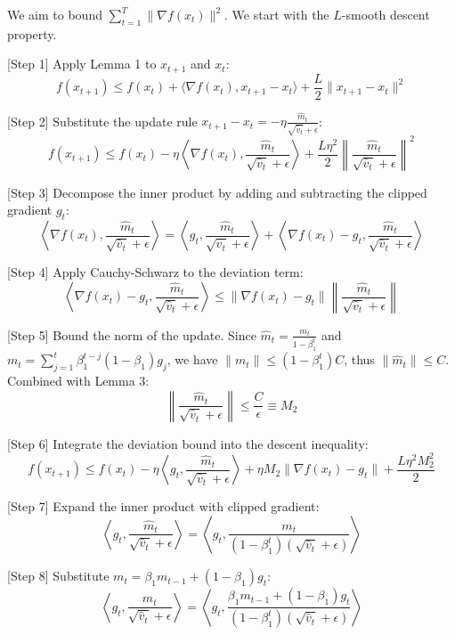 \documentclass{article}
\begin{document}
We aim to bound $\sum_{t=1}^T \|\nabla f(x_t)\|^2$. We start with the $L$-smooth descent property.

[Step 1] Apply Lemma 1 to $x_{t+1}$ and $x_t$:
$$ f(x_{t+1}) \leq f(x_t) + \langle \nabla f(x_t), x_{t+1} - x_t \rangle + \frac{L}{2} \|x_{t+1} - x_t\|^2 $$

[Step 2] Substitute the update rule $x_{t+1} - x_t = -\eta \frac{\hat{m}_t}{\sqrt{\hat{v}_t} + \epsilon}$:
$$ f(x_{t+1}) \leq f(x_t) - \eta \left\langle \nabla f(x_t), \frac{\hat{m}_t}{\sqrt{\hat{v}_t} + \epsilon} \right\rangle + \frac{L \eta^2}{2} \left\| \frac{\hat{m}_t}{\sqrt{\hat{v}_t} + \epsilon} \right\|^2 $$

[Step 3] Decompose the inner product by adding and subtracting the clipped gradient $g_t$:
$$ \left\langle \nabla f(x_t), \frac{\hat{m}_t}{\sqrt{\hat{v}_t} + \epsilon} \right\rangle = \left\langle g_t, \frac{\hat{m}_t}{\sqrt{\hat{v}_t} + \epsilon} \right\rangle + \left\langle \nabla f(x_t) - g_t, \frac{\hat{m}_t}{\sqrt{\hat{v}_t} + \epsilon} \right\rangle $$

[Step 4] Apply Cauchy-Schwarz to the deviation term:
$$ \left\langle \nabla f(x_t) - g_t, \frac{\hat{m}_t}{\sqrt{\hat{v}_t} + \epsilon} \right\rangle \leq \|\nabla f(x_t) - g_t\| \left\| \frac{\hat{m}_t}{\sqrt{\hat{v}_t} + \epsilon} \right\| $$

[Step 5] Bound the norm of the update. Since $\hat{m}_t = \frac{m_t}{1-\beta_1^t}$ and $m_t = \sum_{j=1}^t \beta_1^{t-j} (1-\beta_1) g_j$, we have $\|m_t\| \leq (1-\beta_1^t) C$, thus $\|\hat{m}_t\| \leq C$. Combined with Lemma 3:
$$ \left\| \frac{\hat{m}_t}{\sqrt{\hat{v}_t} + \epsilon} \right\| \leq \frac{C}{\epsilon} \equiv M_2 $$

[Step 6] Integrate the deviation bound into the descent inequality:
$$ f(x_{t+1}) \leq f(x_t) - \eta \left\langle g_t, \frac{\hat{m}_t}{\sqrt{\hat{v}_t} + \epsilon} \right\rangle + \eta M_2 \|\nabla f(x_t) - g_t\| + \frac{L \eta^2 M_2^2}{2} $$

[Step 7] Expand the inner product with clipped gradient:
$$ \left\langle g_t, \frac{\hat{m}_t}{\sqrt{\hat{v}_t} + \epsilon} \right\rangle = \left\langle g_t, \frac{m_t}{(1-\beta_1^t)(\sqrt{\hat{v}_t} + \epsilon)} \right\rangle $$

[Step 8] Substitute $m_t = \beta_1 m_{t-1} + (1-\beta_1) g_t$:
$$ \left\langle g_t, \frac{\hat{m}_t}{\sqrt{\hat{v}_t} + \epsilon} \right\rangle = \left\langle g_t, \frac{\beta_1 m_{t-1} + (1-\beta_1) g_t}{(1-\beta_1^t)(\sqrt{\hat{v}_t} + \epsilon)} \right\rangle $$
\end{document}
